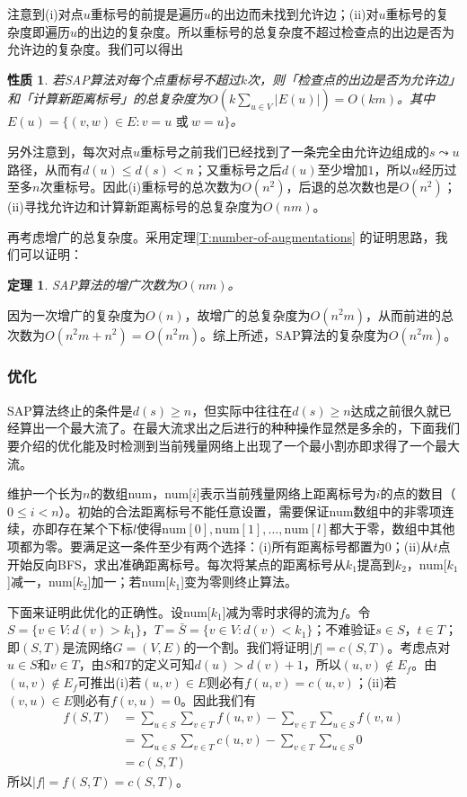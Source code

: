 \documentclass[a4paper]{ctexbook}
\newtheorem{theorem}{定理}[chapter] %
\newtheorem{property}{性质}[chapter]
\begin{document}
  注意到(i)对点$u$重标号的前提是遍历$u$的出边而未找到允许边；(ii)对$u$重标号的复杂度即遍历$u$的出边的复杂度。所以重标号的总复杂度不超过检查点的出边是否为允许边的复杂度。我们可以得出
  \begin{property}
    若SAP算法对每个点重标号不超过$k$次，则「检查点的出边是否为允许边」和「计算新距离标号」的总复杂度为$O(k\sum\limits_{u\in V}|E(u)|)=O(km)$。其中$E(u)=\{(v,w)\in E\colon v= u \text{ 或}\ w = u\}$。
  \end{property}
  另外注意到，每次对点$u$重标号之前我们已经找到了一条完全由允许边组成的$s\leadsto u$路径，从而有$d(u)\le d(s)< n$；又重标号之后$d(u)$至少增加$1$，所以$u$经历过至多$n$次重标号。因此(i)重标号的总次数为$O(n^2)$，后退的总次数也是$O(n^2)$；(ii)寻找允许边和计算新距离标号的总复杂度为$O(nm)$。

  再考虑增广的总复杂度。采用定理\ref{T:number-of-augmentations} 的证明思路，我们可以证明：
  \begin{theorem}
    SAP算法的增广次数为$O(nm)$。
  \end{theorem}
  因为一次增广的复杂度为$O(n)$，故增广的总复杂度为$O(n^2m)$，从而前进的总次数为$O(n^2m+n^2)=O(n^2m)$。综上所述，SAP算法的复杂度为$O(n^2m)$。
  \subsubsection{优化}
  SAP算法终止的条件是$d(s)\ge n$，但实际中往往在$d(s)\ge n$达成之前很久就已经算出一个最大流了。在最大流求出之后进行的种种操作显然是多余的，下面我们要介绍的优化能及时检测到当前残量网络上出现了一个最小割亦即求得了一个最大流。

  维护一个长为$n$的数组num，num[$i$]表示当前残量网络上距离标号为$i$的点的数目（$0\le i < n$）。初始的合法距离标号不能任意设置，需要保证num数组中的非零项连续，亦即存在某个下标$l$使得$\mathrm{num}[0],\mathrm{num}[1],\dots,\mathrm{num}[l]$都大于零，数组中其他项都为零。要满足这一条件至少有两个选择：(i)所有距离标号都置为$0$；(ii)从$t$点开始反向BFS，求出准确距离标号。每次将某点的距离标号从$k_1$提高到$k_2$，num[$k_1$]减一，num[$k_2$]加一；若num[$k_1$]变为零则终止算法。

  下面来证明此优化的正确性。设num[$k_1$]减为零时求得的流为$f$。令$S=\{v\in V\colon d(v)>k_1\}$，$T=\bar{S}=\{v\in V\colon d(v)<k_1\}$；不难验证$s\in S$，$t\in T$；即$(S,T)$是流网络$G=(V,E)$的一个割。我们将证明$|f|=c(S,T)$。考虑点对$u\in S$和$v\in T$，由$S$和$T$的定义可知$d(u)>d(v)+1$，所以$(u,v)\notin E_f$。由$(u,v)\notin E_f$可推出(i)若$(u,v)\in E$则必有$f(u,v) = c(u,v)$；(ii)若$(v,u)\in E$则必有$f(v,u)=0$。因此我们有
  \begin{align*}
    f(S,T) &= \sum_{u\in S}\sum_{v\in T}f(u,v)-\sum_{v\in T}\sum_{u\in S}f(v,u)\\
    &= \sum_{u\in S}\sum_{v\in T}c(u,v)-\sum_{v\in T}\sum_{u\in S}0\\
    &= c(S,T)
  \end{align*}
  所以$|f|=f(S,T)=c(S,T)$。
\end{document}
